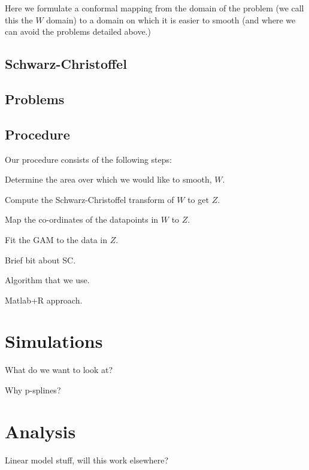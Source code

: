 \documentclass[a4paper,10pt]{amsart}
\newcommand{\sch}{Schwarz-Christoffel }
\begin{document}
Here we formulate a conformal mapping from the domain of the problem (we call this the $W$ domain) to a domain on which it is easier to smooth (and where we can avoid the problems detailed above.)

\subsection{\sch}


\subsection{Problems}


\subsection{Procedure}

Our procedure consists of the following steps:

Determine the area over which we would like to smooth, $W$.

Compute the \sch transform of $W$ to get $Z$.

Map the co-ordinates of the datapoints in $W$ to $Z$.

Fit the GAM to the data in $Z$.







Brief bit about SC.

Algorithm that we use.

Matlab+R approach.



\section{Simulations}

What do we want to look at?

Why p-splines?


\section{Analysis}


Linear model stuff, will this work elsewhere?
















\end{document}
